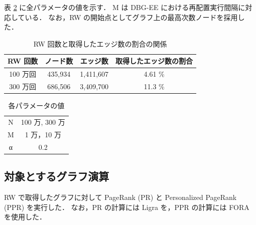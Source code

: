 表 \ref{parameter} に全パラメータの値を示す．
M は DBG-EE における再配置実行間隔に対応している．
なお，RW の開始点としてグラフ上の最高次数ノードを採用した．
\begin{table}[t]
  \begin{center}
    \caption{RW 回数と取得したエッジ数の割合の関係}
    \begin{tabular}{cccc} \toprule
      RW 回数 & ノード数 & エッジ数 & 取得したエッジ数の割合 \\ \hline
      100 万回 & 435,934 & 1,411,607 & 4.61 \%　\\
      300 万回 & 686,506 & 3,409,700 & 11.3 \% \\ \bottomrule
    \end{tabular}
    \label{rw_graph}
  \end{center}
\end{table}
\begin{table}[t]
  \begin{center}
    \caption{各パラメータの値}
    \begin{tabular}{cc} \toprule
      N & 100 万, 300 万 \\
      M & 1 万，10 万 \\
      α & 0.2 \\ \bottomrule
    \end{tabular}
    \label{parameter}
  \end{center}
\end{table}


\subsection{対象とするグラフ演算}
RW で取得したグラフに対して PageRank (PR) と Personalized PageRank (PPR) を実行した．
なお，PR の計算には Ligra \cite{shun2013ligra} を，PPR の計算には FORA \cite{wang2017fora} を使用した．

